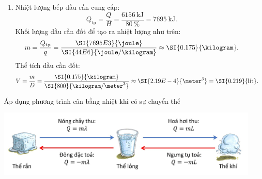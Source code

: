 \begin{vd}
{\begin{enumerate}[label=\alph*)]
\begin{itemize}
					$$Q_3=mc_\text{n}\left(\SI{100}{\celsius}-\SI{0}{\celsius}\right)=\left(\SI{2}{\kilogram}\right)\cdot\left[\SI{4200}{\joule/\left(\kilogram\cdot\kelvin\right)}\right]\cdot\left(\SI{100}{\celsius}\right)=\SI{840}{\kilo\joule}.$$
					\item Nước hoá hơi hoàn toàn ở $\SI{100}{\celsius}$:
					$$Q_4=mL=\left(\SI{2}{\kilogram}\right)\cdot\left(\SI{23E5}{\joule/\kilogram}\right)=\SI{4600}{\kilo\joule}.$$
				\end{itemize}
				Tổng nhiệt lượng đá cần thu vào để hoá hơi hoàn toàn ở $\SI{100}{\celsius}$:
				$$Q=Q_1+Q_2+Q_3+Q_4=\SI{6156}{\kilo\joule}.$$
				\item Nhiệt lượng bếp dầu cần cung cấp:
				$$Q_\text{tp}=\dfrac{Q}{H}=\dfrac{\SI{6156}{\kilo\joule}}{\SI{80}{\percent}}=\SI{7695}{\kilo\joule}.$$
				Khối lượng dầu cần đốt để tạo ra nhiệt lượng như trên:
				$$m=\dfrac{Q_\text{tp}}{q}=\dfrac{\SI{7695E3}{\joule}}{\SI{44E6}{\joule/\kilogram}}\approx\SI{0.175}{\kilogram}.$$
				Thể tích dầu cần đốt:
				$$V=\dfrac{m}{D}=\dfrac{\SI{0.175}{\kilogram}}{\SI{800}{\kilogram/\meter^3}}\approx\SI{2.19E-4}{\meter^3}=\SI{0.219}{\text{lít}}.$$
			\end{enumerate}
		}
		
	\end{vd}
	\begin{dang}
		{Áp dụng phương trình cân bằng nhiệt khi có sự chuyển thể}
		\begin{center}
			\includegraphics[width=0.8\linewidth]{figs/VN12-Y24-PH-SYL-006-1}
		\end{center}
	\end{dang}
